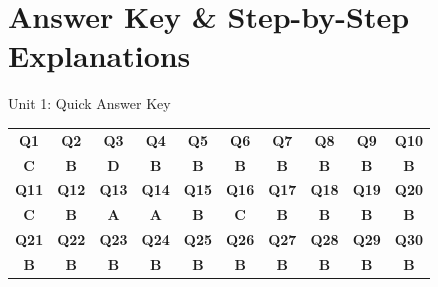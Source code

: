 

\newpage
\section*{Answer Key \& Step-by-Step Explanations}

\begin{answerkeytable}{Unit 1: Quick Answer Key}
\begin{tabular}{c c c c c c c c c c}
\toprule
\textbf{Q1} & \textbf{Q2} & \textbf{Q3} & \textbf{Q4} & \textbf{Q5} & \textbf{Q6} & \textbf{Q7} & \textbf{Q8} & \textbf{Q9} & \textbf{Q10} \\
\textbf{C} & \textbf{B} & \textbf{D} & \textbf{B} & \textbf{B} & \textbf{B} & \textbf{B} & \textbf{B} & \textbf{B} & \textbf{B} \\
\midrule
\textbf{Q11} & \textbf{Q12} & \textbf{Q13} & \textbf{Q14} & \textbf{Q15} & \textbf{Q16} & \textbf{Q17} & \textbf{Q18} & \textbf{Q19} & \textbf{Q20} \\
\textbf{C} & \textbf{B} & \textbf{A} & \textbf{A} & \textbf{B} & \textbf{C} & \textbf{B} & \textbf{B} & \textbf{B} & \textbf{B} \\
\midrule
\textbf{Q21} & \textbf{Q22} & \textbf{Q23} & \textbf{Q24} & \textbf{Q25} & \textbf{Q26} & \textbf{Q27} & \textbf{Q28} & \textbf{Q29} & \textbf{Q30} \\
\textbf{B} & \textbf{B} & \textbf{B} & \textbf{B} & \textbf{B} & \textbf{B} & \textbf{B} & \textbf{B} & \textbf{B} & \textbf{B} \\
\bottomrule
\end{tabular}
\end{answerkeytable}

